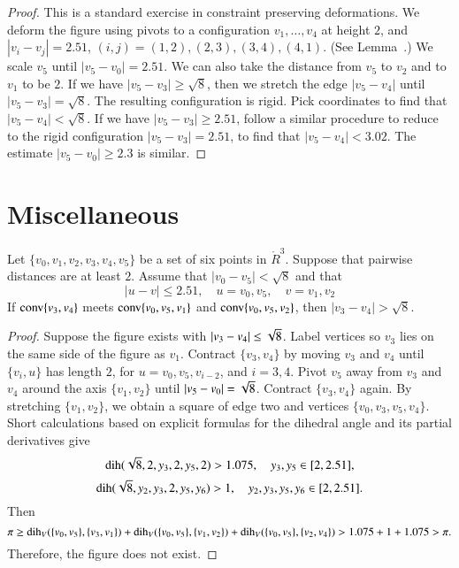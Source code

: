 \begin{proof}
This is a standard exercise in constraint preserving deformations.
We deform the figure using pivots to a configuration
$v_1,\ldots,v_4$ at height $2$, and $|v_i-v_j|=2.51$,
$(i,j)=(1,2),(2,3),(3,4),(4,1)$. (See Lemma~.)
We scale $v_5$ until $|v_5-v_0|=2.51
$. We can also take the distance from $v_5$ to $v_2$ and to $v_1$
to be $2$. If we have $|v_5-v_3|\ge \sqrt{8}$, then we stretch
the edge $|v_5-v_4|$ until $|v_5-v_3|=\sqrt{8}$. The resulting
configuration is rigid.  Pick coordinates to find that
$|v_5-v_4|<\sqrt{8}$. If we have $|v_5-v_3|\ge 2.51 $, follow a
similar procedure to reduce to the rigid configuration
$|v_5-v_3|=2.51$, to find that $|v_5-v_4|<3.02$. The estimate
$|v_5-v_0|\ge2.3$ is similar.
\end{proof}




\newpage

\section{Miscellaneous}



\begin{lemma} 
Let $\{v_0,v_1,v_2,v_3,v_4,v_5\}$ be a set of six points in
$\ring{R}^3$.  Suppose that pairwise distances are at least $2$.
Assume that $|v_0-v_5|<\sqrt8$ and that
  $$|u-v| \le 2.51,\quad u=v_0,v_5,\quad v = v_1,v_2$$
If ${\operatorname{conv}}\{v_3,v_4\}$ meets 
${\operatorname{conv}}\{v_0,v_5,v_1\}$ and ${\operatorname{conv}}\{v_0,v_5,v_2\}$,
then $|v_3-v_4|>\sqrt8$.
\end{lemma}

\begin{proof}
Suppose the figure exists with $|v_3-v_4|\le\sqrt8$. Label vertices
so $v_3$ lies on the same side of the figure as $v_1$. Contract
$\{v_3,v_4\}$ by moving $v_3$ and $v_4$ until
    $\{v_i,u\}$ has length $2$,
for $u=v_0,v_5,v_{i-2}$, and $i=3,4$. Pivot $v_5$ away from $v_3$ and
$v_4$ around the axis $\{v_1,v_2\}$ until
    $|v_5-v_0|=\sqrt8$.
Contract $\{v_3,v_4\}$ again. By stretching $\{v_1,v_2\}$, we
obtain a square of edge two and vertices $\{v_0,v_3,v_5,v_4\}$. Short
calculations based on explicit formulas for the dihedral angle and
its partial derivatives give
    $$
        \operatorname{dih}(\sqrt8,2,y_3,2,y_5,2) > 1.075,\quad
        y_3,y_5\in[2,2.51],
    $$
    $$
    \operatorname{dih}(\sqrt8,y_2,y_3,2,y_5,y_6) >1,\quad
        y_2,y_3,y_5,y_6\in[2,2.51].
   $$
Then
$$\pi\ge \operatorname{dih}_V(\{v_0,v_5\},\{v_3,v_1\}) + \operatorname{dih}_V(\{v_0,v_5\},\{v_1,v_2\}) + 
\operatorname{dih}_V(\{v_0,v_5\},\{v_2,v_4\})
    > 1.075 + 1 + 1.075 > \pi.$$
Therefore, the figure does not exist.
\end{proof}


